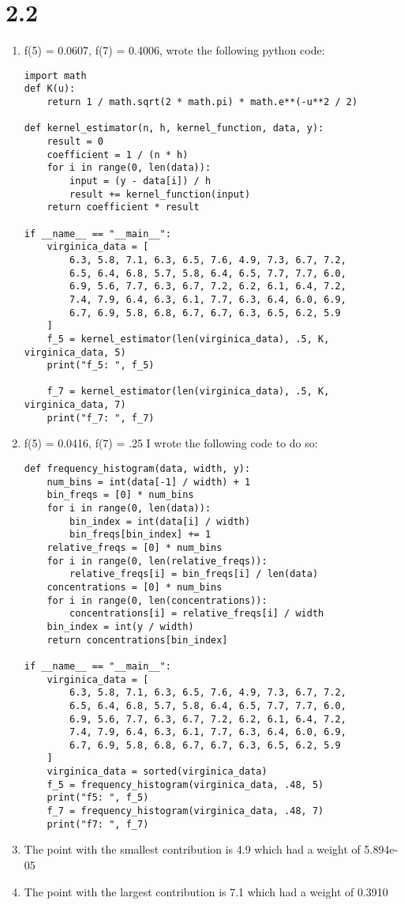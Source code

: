 \documentclass{article}
\begin{document}
\section*{2.2}
\begin{enumerate}
\item f(5) = 0.0607, f(7) = 0.4006, wrote the following python code: \\
\begin{verbatim}
import math
def K(u):
    return 1 / math.sqrt(2 * math.pi) * math.e**(-u**2 / 2) 

def kernel_estimator(n, h, kernel_function, data, y):
    result = 0
    coefficient = 1 / (n * h)
    for i in range(0, len(data)):
        input = (y - data[i]) / h
        result += kernel_function(input)
    return coefficient * result

if __name__ == "__main__":
    virginica_data = [
        6.3, 5.8, 7.1, 6.3, 6.5, 7.6, 4.9, 7.3, 6.7, 7.2,
        6.5, 6.4, 6.8, 5.7, 5.8, 6.4, 6.5, 7.7, 7.7, 6.0,
        6.9, 5.6, 7.7, 6.3, 6.7, 7.2, 6.2, 6.1, 6.4, 7.2,
        7.4, 7.9, 6.4, 6.3, 6.1, 7.7, 6.3, 6.4, 6.0, 6.9,
        6.7, 6.9, 5.8, 6.8, 6.7, 6.7, 6.3, 6.5, 6.2, 5.9
    ]
    f_5 = kernel_estimator(len(virginica_data), .5, K, virginica_data, 5)
    print("f_5: ", f_5)

    f_7 = kernel_estimator(len(virginica_data), .5, K, virginica_data, 7)
    print("f_7: ", f_7)
\end{verbatim}
\item f(5) = 0.0416, f(7) = .25 I wrote the following code to do so: \\
\begin{verbatim}
def frequency_histogram(data, width, y):
    num_bins = int(data[-1] / width) + 1
    bin_freqs = [0] * num_bins
    for i in range(0, len(data)):
        bin_index = int(data[i] / width)
        bin_freqs[bin_index] += 1
    relative_freqs = [0] * num_bins
    for i in range(0, len(relative_freqs)):
        relative_freqs[i] = bin_freqs[i] / len(data)
    concentrations = [0] * num_bins
    for i in range(0, len(concentrations)):
        concentrations[i] = relative_freqs[i] / width
    bin_index = int(y / width)
    return concentrations[bin_index]

if __name__ == "__main__":
    virginica_data = [
        6.3, 5.8, 7.1, 6.3, 6.5, 7.6, 4.9, 7.3, 6.7, 7.2,
        6.5, 6.4, 6.8, 5.7, 5.8, 6.4, 6.5, 7.7, 7.7, 6.0,
        6.9, 5.6, 7.7, 6.3, 6.7, 7.2, 6.2, 6.1, 6.4, 7.2,
        7.4, 7.9, 6.4, 6.3, 6.1, 7.7, 6.3, 6.4, 6.0, 6.9,
        6.7, 6.9, 5.8, 6.8, 6.7, 6.7, 6.3, 6.5, 6.2, 5.9
    ]
    virginica_data = sorted(virginica_data)
    f_5 = frequency_histogram(virginica_data, .48, 5)
    print("f5: ", f_5)
    f_7 = frequency_histogram(virginica_data, .48, 7)
    print("f7: ", f_7)
\end{verbatim}
\item The point with the smallest contribution is 4.9 which had a weight of 5.894e-05 \\
\item The point with the largest contribution is 7.1 which had a weight of 0.3910
\end{enumerate}
\end{document}
